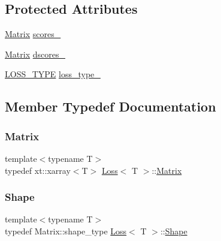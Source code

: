 \subsection*{Protected Attributes}
\begin{DoxyCompactItemize}
\item 
\mbox{\hyperlink{class_loss_a0cb2ca4ba669a18f628d747a995cd26c}{Matrix}} \mbox{\hyperlink{class_loss_a7461ce8c4cce7e4ae76082745003a732}{scores\+\_\+}}
\item 
\mbox{\hyperlink{class_loss_a0cb2ca4ba669a18f628d747a995cd26c}{Matrix}} \mbox{\hyperlink{class_loss_a825f6b10be0c8cca8e7335d9eb36a08a}{dscores\+\_\+}}
\item 
\mbox{\hyperlink{loss_8hpp_a72b6675b9bd68360ebc6e54006d8220f}{L\+O\+S\+S\+\_\+\+T\+Y\+PE}} \mbox{\hyperlink{class_loss_a4644165153615ba6b8cdbcff61785555}{loss\+\_\+type\+\_\+}}
\end{DoxyCompactItemize}


\subsection{Member Typedef Documentation}
\mbox{\label{class_loss_a0cb2ca4ba669a18f628d747a995cd26c}} 
\subsubsection{\texorpdfstring{Matrix}{Matrix}}
{\footnotesize\ttfamily template$<$typename T$>$ \\
typedef xt\+::xarray$<$T$>$ \mbox{\hyperlink{class_loss}{Loss}}$<$ T $>$\+::\mbox{\hyperlink{class_loss_a0cb2ca4ba669a18f628d747a995cd26c}{Matrix}}}

\mbox{\label{class_loss_a5523cc159d9a0707e9e3fd447f0a832a}} 
\subsubsection{\texorpdfstring{Shape}{Shape}}
{\footnotesize\ttfamily template$<$typename T$>$ \\
typedef Matrix\+::shape\+\_\+type \mbox{\hyperlink{class_loss}{Loss}}$<$ T $>$\+::\mbox{\hyperlink{class_loss_a5523cc159d9a0707e9e3fd447f0a832a}{Shape}}}



